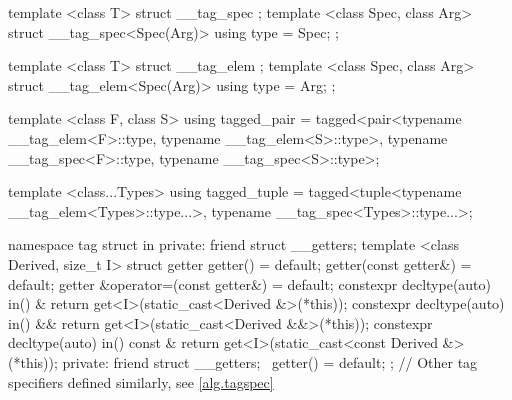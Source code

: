 \begin{codeblock}
{  template <class T>
  struct __tag_spec { };
  template <class Spec, class Arg>
  struct __tag_spec<Spec(Arg)> { using type = Spec; };

  template <class T>
  struct __tag_elem { };
  template <class Spec, class Arg>
  struct __tag_elem<Spec(Arg)> { using type = Arg; };

  template <class F, class S>
  using tagged_pair =
    tagged<pair<typename __tag_elem<F>::type, typename __tag_elem<S>::type>,
           typename __tag_spec<F>::type, typename __tag_spec<S>::type>;

  template <class...Types>
  using tagged_tuple =
    tagged<tuple<typename __tag_elem<Types>::type...>,
           typename __tag_spec<Types>::type...>;

  namespace tag {
    struct in {
    private:
      friend struct __getters;
      template <class Derived, size_t I>
      struct getter {
        getter() = default;
        getter(const getter&) = default;
        getter &operator=(const getter&) = default;
        constexpr decltype(auto) in() & {
          return get<I>(static_cast<Derived &>(*this));
        }
        constexpr decltype(auto) in() && {
          return get<I>(static_cast<Derived &&>(*this));
        }
        constexpr decltype(auto) in() const & {
          return get<I>(static_cast<const Derived &>(*this));
        }
      private:
        friend struct __getters;
        ~getter() = default;
      };
    }
    // Other tag specifiers defined similarly, see \ref{alg.tagspec}
  }
}
\end{codeblock}
